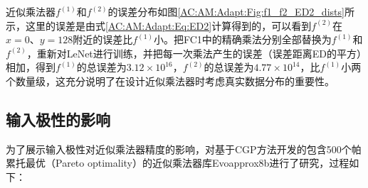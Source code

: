 近似乘法器$f^{(1)}$和$f^{(2)}$的误差分布如图\ref{AC:AM:Adapt:Fig:f1_f2_ED2_dists}所示，这里的误差是由式\eqref{AC:AM:Adapt:Eq:ED2}计算得到的，可以看到$f^{(2)}$在$x=0$、$y=128$附近的误差比$f^{(1)}$小。把FC1中的精确乘法分别全部替换为$f^{(1)}$和$f^{(2)}$，重新对LeNet进行训练，并把每一次乘法产生的误差（误差距离ED的平方）相加，得到$f^{(1)}$的总误差为$3.12 \times 10^{16}$，$f^{(2)}$的总误差为$4.77 \times 10^{14}$，比$f^{(1)}$小两个数量级，这充分说明了在设计近似乘法器时考虑真实数据分布的重要性。

\subsection{输入极性的影响}

为了展示输入极性对近似乘法器精度的影响，对基于CGP方法开发的包含500个帕累托最优（Pareto optimality）的近似乘法器库Evoapprox8b\cite{AC:AM:CGP_Evoapprox8b}进行了研究，过程如下：

